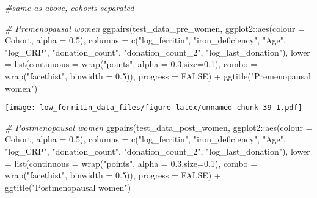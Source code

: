\documentclass[
]{article}
\newenvironment{Shaded}{\begin{snugshade}}{\end{snugshade}}
\newcommand{\AttributeTok}[1]{\textcolor[rgb]{0.77,0.63,0.00}{#1}}
\newcommand{\CommentTok}[1]{\textcolor[rgb]{0.56,0.35,0.01}{\textit{#1}}}
\newcommand{\ConstantTok}[1]{\textcolor[rgb]{0.00,0.00,0.00}{#1}}
\newcommand{\FloatTok}[1]{\textcolor[rgb]{0.00,0.00,0.81}{#1}}
\newcommand{\FunctionTok}[1]{\textcolor[rgb]{0.00,0.00,0.00}{#1}}
\newcommand{\NormalTok}[1]{#1}
\newcommand{\SpecialCharTok}[1]{\textcolor[rgb]{0.00,0.00,0.00}{#1}}
\newcommand{\StringTok}[1]{\textcolor[rgb]{0.31,0.60,0.02}{#1}}
\begin{document}
\begin{Shaded}
\begin{Highlighting}[]
\CommentTok{\#same as above, cohorts separated }

\CommentTok{\# Premenopausal women}
\FunctionTok{ggpairs}\NormalTok{(test\_data\_pre\_women, ggplot2}\SpecialCharTok{::}\FunctionTok{aes}\NormalTok{(}\AttributeTok{colour =}\NormalTok{ Cohort, }\AttributeTok{alpha =} \FloatTok{0.5}\NormalTok{),}
        \AttributeTok{columns =} \FunctionTok{c}\NormalTok{(}\StringTok{"log\_ferritin"}\NormalTok{, }\StringTok{"iron\_deficiency"}\NormalTok{, }\StringTok{"Age"}\NormalTok{, }\StringTok{"log\_CRP"}\NormalTok{,  }\StringTok{"donation\_count"}\NormalTok{, }\StringTok{"donation\_count\_2"}\NormalTok{,}
                    \StringTok{"log\_last\_donation"}\NormalTok{),}
         \AttributeTok{lower =} \FunctionTok{list}\NormalTok{(}\AttributeTok{continuous =} \FunctionTok{wrap}\NormalTok{(}\StringTok{"points"}\NormalTok{, }\AttributeTok{alpha =} \FloatTok{0.3}\NormalTok{,}\AttributeTok{size=}\FloatTok{0.1}\NormalTok{),}
                      \AttributeTok{combo =} \FunctionTok{wrap}\NormalTok{(}\StringTok{"facethist"}\NormalTok{, }\AttributeTok{binwidth =} \FloatTok{0.5}\NormalTok{)),}
        \AttributeTok{progress =} \ConstantTok{FALSE}\NormalTok{) }\SpecialCharTok{+} 
  \FunctionTok{ggtitle}\NormalTok{(}\StringTok{"Premenopausal women"}\NormalTok{)}
\end{Highlighting}
\end{Shaded}

\texttt{[image: low\_ferritin\_data\_files/figure-latex/unnamed-chunk-39-1.pdf]}

\begin{Shaded}
\begin{Highlighting}[]
\CommentTok{\# Postmenopausal women}
\FunctionTok{ggpairs}\NormalTok{(test\_data\_post\_women, ggplot2}\SpecialCharTok{::}\FunctionTok{aes}\NormalTok{(}\AttributeTok{colour =}\NormalTok{ Cohort, }\AttributeTok{alpha =} \FloatTok{0.5}\NormalTok{),}
        \AttributeTok{columns =} \FunctionTok{c}\NormalTok{(}\StringTok{"log\_ferritin"}\NormalTok{, }\StringTok{"iron\_deficiency"}\NormalTok{, }\StringTok{"Age"}\NormalTok{, }\StringTok{"log\_CRP"}\NormalTok{,  }\StringTok{"donation\_count"}\NormalTok{, }\StringTok{"donation\_count\_2"}\NormalTok{,}
                    \StringTok{"log\_last\_donation"}\NormalTok{),}
         \AttributeTok{lower =} \FunctionTok{list}\NormalTok{(}\AttributeTok{continuous =} \FunctionTok{wrap}\NormalTok{(}\StringTok{"points"}\NormalTok{, }\AttributeTok{alpha =} \FloatTok{0.3}\NormalTok{,}\AttributeTok{size=}\FloatTok{0.1}\NormalTok{),}
                      \AttributeTok{combo =} \FunctionTok{wrap}\NormalTok{(}\StringTok{"facethist"}\NormalTok{, }\AttributeTok{binwidth =} \FloatTok{0.5}\NormalTok{)),}
        \AttributeTok{progress =} \ConstantTok{FALSE}\NormalTok{) }\SpecialCharTok{+}
  \FunctionTok{ggtitle}\NormalTok{(}\StringTok{"Postmenopausal women"}\NormalTok{)}
\end{Highlighting}
\end{Shaded}
\end{document}
